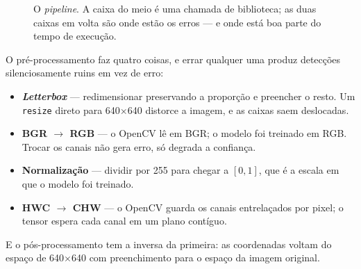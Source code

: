\begin{figure}[htbp]
\centering
{}
\caption{O \emph{pipeline}. A caixa do meio é uma chamada de biblioteca; as duas
         caixas em volta são onde estão os erros --- e onde está boa parte do
         tempo de execução.}
\label{fig:yolo}
\end{figure}

\begin{armadilha}
O pré-processamento faz quatro coisas, e errar qualquer uma produz detecções
silenciosamente ruins em vez de erro:
\begin{itemize}
    \item \textbf{\emph{Letterbox}} --- redimensionar preservando a proporção e
          preencher o resto. Um \texttt{resize} direto para 640$\times$640
          distorce a imagem, e as caixas saem deslocadas.
    \item \textbf{BGR $\rightarrow$ RGB} --- o OpenCV lê em BGR; o modelo foi
          treinado em RGB. Trocar os canais não gera erro, só degrada a
          confiança.
    \item \textbf{Normalização} --- dividir por 255 para chegar a $[0,1]$, que é
          a escala em que o modelo foi treinado.
    \item \textbf{HWC $\rightarrow$ CHW} --- o OpenCV guarda os canais
          entrelaçados por pixel; o tensor espera cada canal em um plano
          contíguo.
\end{itemize}
E o pós-processamento tem a inversa da primeira: as coordenadas voltam do espaço
de 640$\times$640 com preenchimento para o espaço da imagem original.
\end{armadilha}

